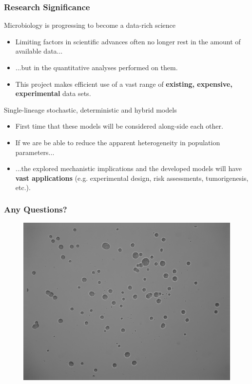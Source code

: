 \documentclass{beamer}
\begin{document}
\begin{frame}
\frametitle{Research Significance}
\begin{block}{Microbiology is progressing to become a data-rich science}
\begin{itemize}
\item Limiting factors in scientific advances often no longer rest in the amount of available data...
\item ...but in the quantitative analyses performed on them.
\item This project makes efficient use of a vast range of \textbf{existing, expensive, experimental} data sets.
\end{itemize}
\end{block}
\begin{block}{Single-lineage stochastic, deterministic and hybrid models}
\begin{itemize}
\item First time that these models will be considered along-side each other.
\item If we are be able to reduce the apparent heterogeneity in population parameters...
\item ...the explored mechanistic implications and the developed models will have \textbf{vast applications} (e.g. experimental design, risk assessments, tumorigenesis, etc.).
\end{itemize}
\end{block}
\end{frame}

\begin{frame}
\frametitle{Any Questions?}
\vspace{-0.8em}
\begin{figure}
\includegraphics[width=0.9\linewidth]{FinishingCells.png}
\end{figure}
\end{frame}
\end{document}
